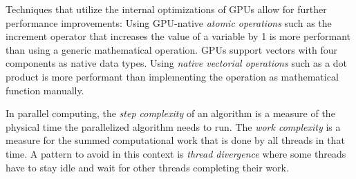 Techniques that utilize the internal optimizations of GPUs allow for further performance improvements: Using GPU-native \textit{atomic operations} such as the increment operator that increases the value of a variable by 1 is more performant than using a generic mathematical operation. GPUs support vectors with four components as native data types. Using \textit{native vectorial operations} such as a dot product is more performant than implementing the operation as mathematical function manually. \cite{cudacourse}

In parallel computing, the \textit{step complexity} of an algorithm is a measure of the physical time the parallelized algorithm needs to run. The \textit{work complexity} is a measure for the summed computational work that is done by all threads in that time. A pattern to avoid in this context is \textit{thread divergence} where some threads have to stay idle and wait for other threads completing their work. \cite{cudacourse}
